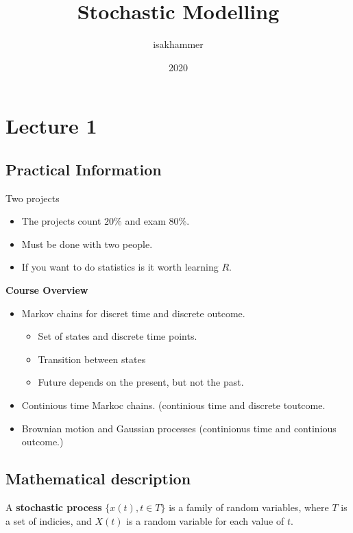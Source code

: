 \documentclass{article}
\title{Stochastic Modelling}
\author{isakhammer }
\date{2020}
\theoremstyle{remark}
\begin{document}
\maketitle
\tableofcontents
\newpage

\newpage
\section{Lecture 1}%
\label{sec:lecture_1}

\subsection{Practical Information}%
\label{sub:practical_information}

Two projects 
\begin{itemize}
  \item The projects count $20 \%$ and exam $80 \%$.
  \item Must be done with two people.
  \item If you want to do statistics is it worth learning $R$.
\end{itemize}

\textbf{Course Overview} 
\begin{itemize}
  \item Markov chains for discret time and discrete outcome.
    \begin{itemize}
      \item Set of states and discrete time points.
      \item Transition between states
      \item Future depends on the present, but not the past.
    \end{itemize}
  \item Continious time Markoc chains. (continious time and discrete toutcome.
  \item Brownian motion and Gaussian processes (continionus time and continious outcome.)
\end{itemize}


\subsection{Mathematical description}%
\label{sub:mathematical_description}
 \begin{definition}
   A \textbf{stochastic process} $\{ x\left( t \right), t \in T\} $ is a family of random variables, where $T$ is a set of indicies, and $X\left( t \right)$ is a random variable for each value of $t$.
 \end{definition}
\end{document}
